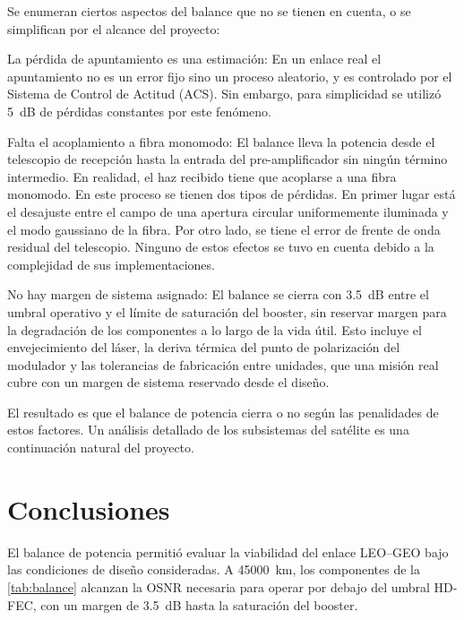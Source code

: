 Se enumeran ciertos aspectos del balance que no se tienen en cuenta, o se simplifican por el alcance del proyecto:
\begin{puntos}
\item{La p\'erdida de apuntamiento es una estimaci\'on:}
En un enlace real el apuntamiento no es un error fijo sino un proceso aleatorio, y es controlado por el Sistema de Control de Actitud (ACS). Sin embargo, para simplicidad se utiliz\'o \SI{5}{\dB} 
de p\'erdidas constantes por este fen\'omeno.

\item{Falta el acoplamiento a fibra monomodo:}
El balance lleva la potencia desde el telescopio de recepci\'on hasta la
entrada del pre-amplificador sin ning\'un t\'ermino intermedio. En realidad, el
haz recibido tiene que acoplarse a una fibra monomodo. En este proceso se tienen dos tipos 
de p\'erdidas. En primer lugar est\'a el desajuste entre el campo de una apertura circular
uniformemente iluminada y el modo gaussiano de la fibra. Por otro lado, se tiene el error de frente de onda residual del
telescopio. Ninguno de estos efectos se tuvo en cuenta debido a la complejidad de sus implementaciones.


\item{No hay margen de sistema asignado:}
El balance se cierra con \SI{3.5}{\dB} entre el umbral operativo y el
l\'imite de saturaci\'on del booster, sin reservar margen para la degradaci\'on
de los componentes a lo largo de la vida \'util. Esto incluye el envejecimiento del l\'aser, la
deriva t\'ermica del punto de polarizaci\'on del modulador y las tolerancias
de fabricaci\'on entre unidades, que una misi\'on real cubre con un margen de
sistema reservado desde el dise\~no.

\end{puntos}
El resultado es que el balance de potencia cierra o no seg\'un las penalidades de estos factores. Un an\'alisis detallado de los subsistemas del sat\'elite es una continuaci\'on natural del proyecto.
\section{Conclusiones}
\label{sec:enl-conclusiones}

El balance de potencia permiti\'o evaluar la viabilidad del enlace LEO--GEO
bajo las condiciones de dise\~no consideradas. A \SI{45000}{\kilo\metre}, los
componentes de la \cref{tab:balance} alcanzan la OSNR necesaria para operar por
debajo del umbral HD-FEC, con un margen de \SI{3.5}{\dB} hasta la saturaci\'on
del booster.

